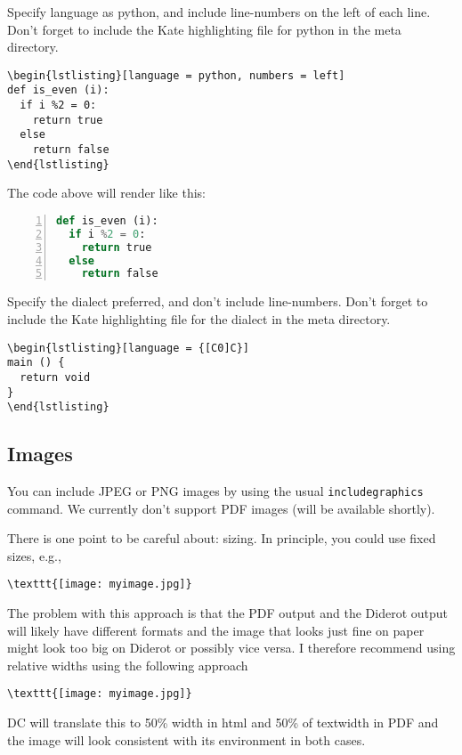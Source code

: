 \begin{flex}
\begin{example}
Specify language as python, and include  line-numbers on the left of each line.
Don't forget to include the Kate highlighting file for python in the meta directory.

\begin{verbatim}
\begin{lstlisting}[language = python, numbers = left]
def is_even (i):
  if i %2 = 0:
    return true
  else 
    return false
\end{lstlisting}
\end{verbatim}
\end{example}

The code above will render like this:
%
\begin{lstlisting}[language = python, numbers = left]
def is_even (i):
  if i %2 = 0:
    return true
  else 
    return false
\end{lstlisting}
\end{flex}


\begin{example}
Specify the dialect preferred, and don't include line-numbers.
%
Don't forget to include the Kate highlighting file for the dialect in the meta directory.

\begin{verbatim}
\begin{lstlisting}[language = {[C0]C}]
main () {
  return void
}
\end{lstlisting}
\end{verbatim}
\end{example}
\subsection{Images}

You can include JPEG or PNG images by using the usual \lstinline`includegraphics` command.  
%
We currently don't support PDF images (will be available shortly).

There is one point to be careful about: sizing.  
%
In principle, you could use fixed sizes, e.g.,
\begin{lstlisting}
\texttt{[image: myimage.jpg]}
\end{lstlisting}
%
The problem with this approach is that the PDF output and the Diderot output will likely have different formats and the image that looks just fine on paper might look too big on Diderot or possibly vice versa.
%
I therefore recommend using relative widths using the following approach
\begin{lstlisting}
\texttt{[image: myimage.jpg]}
\end{lstlisting}
DC will translate this to 50\% width in html and 50\% of textwidth in PDF and the image will look consistent with its environment in both cases.  

